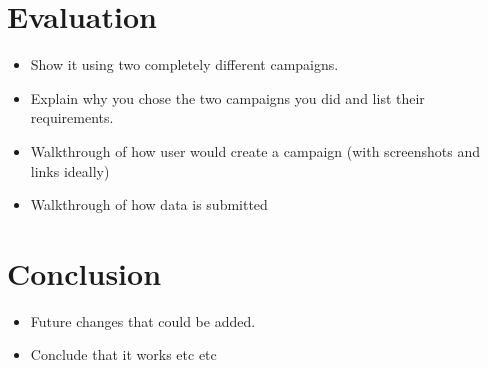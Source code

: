 \documentclass{article}
\let\oldsection\section
\renewcommand\section{\clearpage\oldsection}
\begin{document}
	\section{Evaluation}
	\label{sec:evaluation}
		\begin{itemize}
			\item Show it using two completely different campaigns.
			\item Explain why you chose the two campaigns you did and list their requirements.
			\item Walkthrough of how user would create a campaign (with screenshots and links ideally)
			\item Walkthrough of how data is submitted
		\end{itemize}
	\section{Conclusion}
	\label{sec:conclusion}
		\begin{itemize}
			\item Future changes that could be added.
			\item Conclude that it works etc etc
		\end{itemize}

	
	
\end{document}
